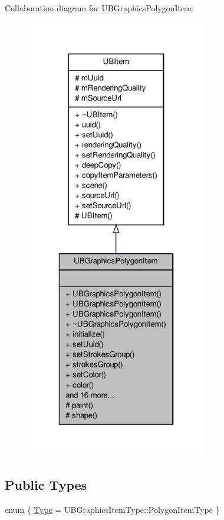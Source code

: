 Collaboration diagram for U\-B\-Graphics\-Polygon\-Item\-:
\nopagebreak
\begin{figure}[H]
\begin{center}
\leavevmode
\includegraphics[height=550pt]{db/de2/class_u_b_graphics_polygon_item__coll__graph}
\end{center}
\end{figure}
\subsection*{Public Types}
\begin{DoxyCompactItemize}
\item 
enum \{ \hyperlink{class_u_b_graphics_polygon_item_a1acd33a55453d233c333a6d6e8896e5da15789bea86a37e6d6c688472abc48a54}{Type} =  U\-B\-Graphics\-Item\-Type\-:\-:Polygon\-Item\-Type
 \}
\end{DoxyCompactItemize}
